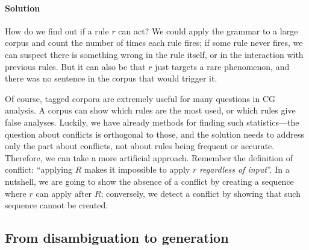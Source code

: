 
\paragraph{Solution}

How do we find out if a rule $r$ can act? 
We could apply the grammar to a large corpus and count the number of times 
each rule fires; if some rule never fires, we can suspect there is something wrong 
in the rule itself, or in the interaction with previous rules. 
But it can also be that $r$ just targets a rare phenomenon, and there was no sentence in the corpus that would trigger it.

Of course, tagged corpora are extremely useful for many questions in CG analysis.
A corpus can show which rules are the most used, or which rules give false analyses. 
Luckily, we have already methods for finding such statistics---the question 
about conflicts is orthogonal to those, and the solution needs to address only 
the part about conflicts, not about rules being frequent or accurate.
Therefore, we can take a more artificial approach. %
Remember the definition of conflict: ``applying $R$ makes it impossible to apply $r$ \emph{regardless of input}''.
In a nutshell, we are going to show the absence of a conflict by creating 
a sequence where $r$ can apply after $R$; conversely, we detect a conflict by 
showing that such sequence cannot be created.




\def\newVar{$\text{\em word}'_\textsc{ RD}$}
\def\oldVar{$\text{\em word}_\textsc{\,RD}$}
\def\eqdef{\Coloneqq}
\def\invConds{\text{invalid condition}}
\def\onlyTrgLeft{\text{only target left}}

\subsection{From disambiguation to generation}

